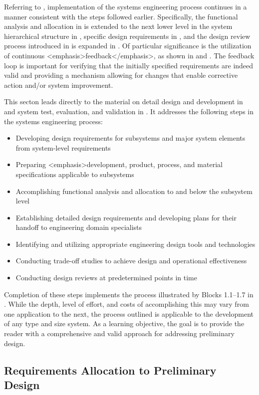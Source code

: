 Referring to , implementation of the systems engineering process continues in a manner consistent with the steps followed earlier. Specifically, the functional analysis and allocation in  is extended to the next lower level in the system hierarchical structure in , specific design requirements in , and the design review process introduced in  is expanded in . Of particular significance is the utilization of continuous <emphasis>feedback</emphasis>, as shown in  and . The feedback loop is important for verifying that the initially specified requirements are indeed valid and providing a mechanism allowing for changes that enable corrective action and/or system improvement.

This secton leads directly to the material on detail design and development in and system test, evaluation, and validation in . It addresses the following steps in the systems engineering process:

\begin{itemize}
\item Developing design requirements for subsystems and major system elements from system-level requirements
\item Preparing <emphasis>development, product, process, and material specifications applicable to subsystems
\item Accomplishing functional analysis and allocation to and below the subsystem level
\item Establishing detailed design requirements and developing plans for their handoff to engineering domain specialists
\item Identifying and utilizing appropriate engineering design tools and technologies
\item Conducting trade-off studies to achieve design and operational effectiveness
\item Conducting design reviews at predetermined points in time
\end{itemize}

Completion of these steps implements the process illustrated by Blocks 1.1–1.7 in . While the depth, level of effort, and costs of accomplishing this may vary from one application to the next, the process outlined is applicable to the development of any type and size system. As a learning objective, the goal is to provide the reader with a comprehensive and valid approach for addressing preliminary design.

\subsection{Requirements Allocation to Preliminary Design}


